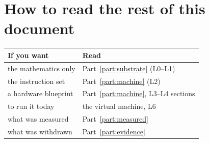 \section{How to read the rest of this document}

\begin{center}
\small
\begin{tabular}{@{}l l@{}}
\toprule
\textbf{If you want} & \textbf{Read} \\
\midrule
the mathematics only            & Part~\ref{part:substrate} (L0--L1) \\
the instruction set             & Part~\ref{part:machine} (L2) \\
a hardware blueprint            & Part~\ref{part:machine}, L3--L4 sections \\
to run it today                 & the virtual machine, L6 \\
what was measured               & Part~\ref{part:measured} \\
what was withdrawn              & Part~\ref{part:evidence} \\
\bottomrule
\end{tabular}
\end{center}
